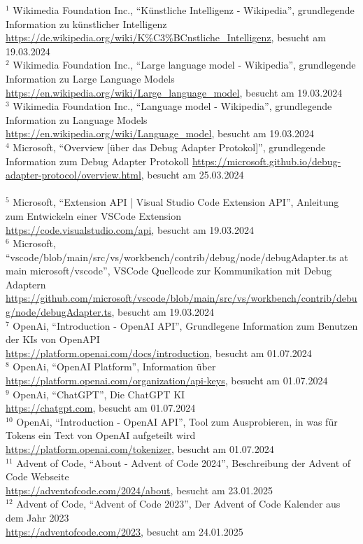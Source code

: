 \documentclass[a4paper,12pt,ngerman]{scrartcl}
\begin{document}
$^1$ Wikimedia Foundation Inc.,  ``Künstliche Intelligenz - Wikipedia'', grundlegende Information zu künstlicher Intelligenz\\
\url{https://de.wikipedia.org/wiki/K\%C3\%BCnstliche_Intelligenz}, besucht am 19.03.2024\\
$^2$ Wikimedia Foundation Inc.,  ``Large language model - Wikipedia'', grundlegende Information zu Large Language Models\\
\url{https://en.wikipedia.org/wiki/Large_language_model}, besucht am 19.03.2024\\
$^3$ Wikimedia Foundation Inc.,  ``Language model - Wikipedia'', grundlegende Information zu Language Models \\
\url{https://en.wikipedia.org/wiki/Language_model}, besucht am 19.03.2024\\
$^4$ Microsoft, ``Overview [über das Debug Adapter Protokol]'', grundlegende Information zum Debug Adapter Protokoll
\url{https://microsoft.github.io/debug-adapter-protocol/overview.html}, besucht am 25.03.2024\\
\vspace{1em}\\
$^5$ Microsoft, ``Extension API | Visual Studio Code Extension API'', Anleitung zum Entwickeln einer VSCode Extension\\
\url{https://code.visualstudio.com/api}, besucht am 19.03.2024\\
$^6$ Microsoft, ``vscode/blob/main/src/vs/workbench/contrib/debug/node/debugAdapter.ts at main microsoft/vscode'', VSCode Quellcode zur Kommunikation mit Debug Adaptern\\
\url{https://github.com/microsoft/vscode/blob/main/src/vs/workbench/contrib/debug/node/debugAdapter.ts}, besucht am 19.03.2024\\
$^7$ OpenAi, ``Introduction - OpenAI API'', Grundlegene Information zum Benutzen der KIs von OpenAPI\\
\url {https://platform.openai.com/docs/introduction}, besucht am 01.07.2024\\
$^8$ OpenAi, ``OpenAI Platform'', Information über\\
\url {https://platform.openai.com/organization/api-keys}, besucht am 01.07.2024\\
$^9$ OpenAi, ``ChatGPT'', Die ChatGPT KI\\
\url {https://chatgpt.com}, besucht am 01.07.2024\\
$^{10}$ OpenAi, ``Introduction - OpenAI API'', Tool zum Ausprobieren, in was für Tokens ein Text von OpenAI aufgeteilt wird\\
\url {https://platform.openai.com/tokenizer}, besucht am 01.07.2024\\
$^{11}$ Advent of Code, ``About - Advent of Code 2024'', Beschreibung der Advent of Code Webseite\\
\url {https://adventofcode.com/2024/about}, besucht am 23.01.2025\\
$^{12}$ Advent of Code, ``Advent of Code 2023'', Der Advent of Code Kalender aus dem Jahr 2023\\
\url {https://adventofcode.com/2023}, besucht am 24.01.2025\\
\end{document}
